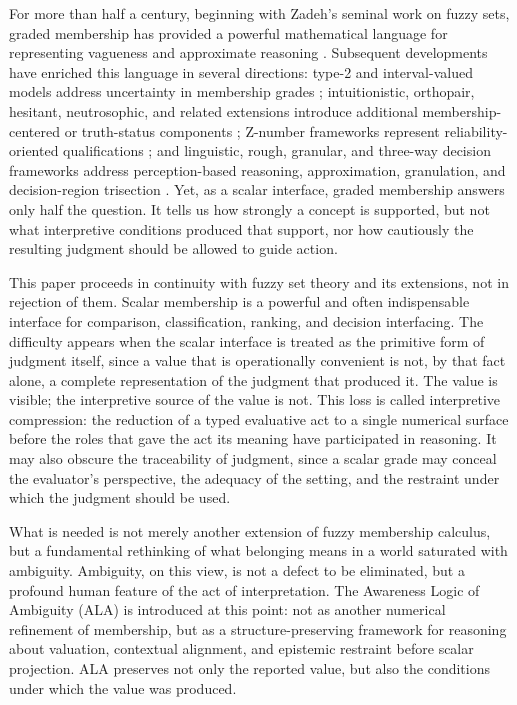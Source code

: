 \documentclass[reqno,final]{amsart}
\theoremstyle{definition}
\theoremstyle{plain}
\theoremstyle{remark}
\begin{document}
For more than half a century, beginning with Zadeh's seminal work on fuzzy sets, graded membership has provided a powerful mathematical language for representing vagueness and approximate reasoning \cite{Zadeh1965,Zadeh1975}. Subsequent developments have enriched this language in several directions: type-2 and interval-valued models address uncertainty in membership grades \cite{MendelJohn2002,Bustince2016}; intuitionistic, orthopair, hesitant, neutrosophic, and related extensions introduce additional membership-centered or truth-status components \cite{Atanassov1986,Yager2014,Yager2017,Cuong2014, KutluKahraman2019, Torra2010,Smarandache1998}; Z-number frameworks represent reliability-oriented qualifications \cite{Zadeh2011,Yager2012}; and linguistic, rough, granular, and three-way decision frameworks address perception-based reasoning, approximation, granulation, and decision-region trisection \cite{Zadeh1996,Zadeh1997,Pawlak1982,Yao2010,Pedrycz2013}. Yet, as a scalar interface, graded membership answers only half the question. It tells us how strongly a concept is supported, but not what interpretive conditions produced that support, nor how cautiously the resulting judgment should be allowed to guide action.

This paper proceeds in continuity with fuzzy set theory and 
its extensions, not in rejection of them. Scalar membership 
is a powerful and often indispensable interface for comparison, 
classification, ranking, and decision interfacing. The difficulty 
appears when the scalar interface is treated as the primitive 
form of judgment itself, since a value that is operationally 
convenient is not, by that fact alone, a complete representation 
of the judgment that produced it. The value is visible; the 
interpretive source of the value is not. This loss is called 
interpretive compression: the reduction of a typed evaluative 
act to a single numerical surface before the roles that gave 
the act its meaning have participated in reasoning. It may also 
obscure the traceability of judgment, since a scalar grade may 
conceal the evaluator's perspective, the adequacy of the setting, 
and the restraint under which the judgment should be used.

What is needed is not merely another extension of fuzzy membership calculus, but a fundamental rethinking of what belonging means in a world saturated with ambiguity. Ambiguity, on this view, is not a defect to be eliminated, but a profound human feature of the act of interpretation. The Awareness Logic of Ambiguity (ALA) is introduced at this point: not as another numerical refinement of membership, but as a structure-preserving framework for reasoning about valuation, contextual alignment, and epistemic restraint before scalar projection. ALA preserves not only the reported value, but also the conditions under which the value was produced.
\end{document}
